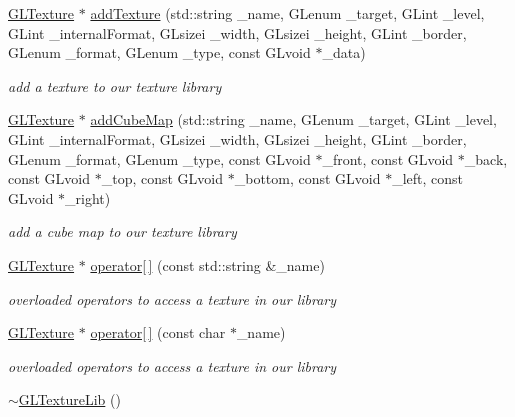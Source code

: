 \begin{DoxyCompactItemize}
\item 
\hyperlink{class_g_l_texture}{G\-L\-Texture} $\ast$ \hyperlink{class_g_l_texture_lib_a778cde3734906f46649defdda30d7d7e}{add\-Texture} (std\-::string \-\_\-name, G\-Lenum \-\_\-target, G\-Lint \-\_\-level, G\-Lint \-\_\-internal\-Format, G\-Lsizei \-\_\-width, G\-Lsizei \-\_\-height, G\-Lint \-\_\-border, G\-Lenum \-\_\-format, G\-Lenum \-\_\-type, const G\-Lvoid $\ast$\-\_\-data)
\begin{DoxyCompactList}\small\item\em add a texture to our texture library \end{DoxyCompactList}\item 
\hyperlink{class_g_l_texture}{G\-L\-Texture} $\ast$ \hyperlink{class_g_l_texture_lib_aece253fdd6aad02adca2d743c463a9f2}{add\-Cube\-Map} (std\-::string \-\_\-name, G\-Lenum \-\_\-target, G\-Lint \-\_\-level, G\-Lint \-\_\-internal\-Format, G\-Lsizei \-\_\-width, G\-Lsizei \-\_\-height, G\-Lint \-\_\-border, G\-Lenum \-\_\-format, G\-Lenum \-\_\-type, const G\-Lvoid $\ast$\-\_\-front, const G\-Lvoid $\ast$\-\_\-back, const G\-Lvoid $\ast$\-\_\-top, const G\-Lvoid $\ast$\-\_\-bottom, const G\-Lvoid $\ast$\-\_\-left, const G\-Lvoid $\ast$\-\_\-right)
\begin{DoxyCompactList}\small\item\em add a cube map to our texture library \end{DoxyCompactList}\item 
\hypertarget{class_g_l_texture_lib_aa18a039ee29d50ccd34a7e1f7d24ce5b}{\hyperlink{class_g_l_texture}{G\-L\-Texture} $\ast$ \hyperlink{class_g_l_texture_lib_aa18a039ee29d50ccd34a7e1f7d24ce5b}{operator\mbox{[}$\,$\mbox{]}} (const std\-::string \&\-\_\-name)}\label{class_g_l_texture_lib_aa18a039ee29d50ccd34a7e1f7d24ce5b}

\begin{DoxyCompactList}\small\item\em overloaded operators to access a texture in our library \end{DoxyCompactList}\item 
\hypertarget{class_g_l_texture_lib_ab4ab9d6def1eb2acecfbe062686ab98e}{\hyperlink{class_g_l_texture}{G\-L\-Texture} $\ast$ \hyperlink{class_g_l_texture_lib_ab4ab9d6def1eb2acecfbe062686ab98e}{operator\mbox{[}$\,$\mbox{]}} (const char $\ast$\-\_\-name)}\label{class_g_l_texture_lib_ab4ab9d6def1eb2acecfbe062686ab98e}

\begin{DoxyCompactList}\small\item\em overloaded operators to access a texture in our library \end{DoxyCompactList}\item 
\hypertarget{class_g_l_texture_lib_aca4b2bd67c1af5b5c1ea304fe2622eac}{\hyperlink{class_g_l_texture_lib_aca4b2bd67c1af5b5c1ea304fe2622eac}{$\sim$\-G\-L\-Texture\-Lib} ()}\label{class_g_l_texture_lib_aca4b2bd67c1af5b5c1ea304fe2622eac}


\end{DoxyCompactItemize}
